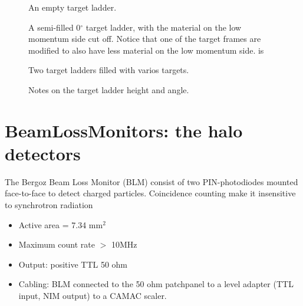\documentclass[11pt]{report}
\begin{document}
\begin{figure}[!ht]
\centerline{\vspace{0cm}\hspace{0cm}
}
\centering
\caption{An empty target ladder.}
\label{fig:tgt-ladder-empty}
\end{figure} 

\begin{figure}[!ht]
\centerline{\vspace{0cm}\hspace{0cm}
}
\centering
\caption{A semi-filled 0$^{\circ}$ target ladder, with the material on the low momentum 
side cut off.  Notice that one of the target frames are modified to also have less material
on the low momentum side.
is }
\label{fig:0degr-tgt-ladder}
\end{figure} 

\begin{figure}[!ht]
\centerline{\vspace{0cm}\hspace{0cm}
}
\centering
\caption{Two target ladders filled with varios targets.}
\label{fig:tgt-ladder-filled}
\end{figure} 

\begin{figure}[!ht]
\centerline{\vspace{0cm}\hspace{0cm}
}
\centering
\caption{Notes on the target ladder height and angle.}
\label{fig:tgtladder-movement}
\end{figure} 

\section{BeamLossMonitors: the halo detectors}

The Bergoz Beam Loss Monitor (BLM) consist of
two PIN-photodiodes mounted face-to-face to detect charged particles.
Coincidence counting make it insensitive to synchrotron radiation 
\begin{itemize} 
\item Active area = 7.34 mm$^2$
\item Maximum count rate $>$ 10MHz 
\item Output: positive TTL 50 ohm
\item Cabling:
BLM connected to the 50 ohm patchpanel to a level adapter (TTL input, NIM output) to a CAMAC scaler.
\end{itemize} 
\end{document}

